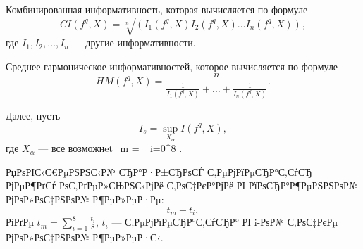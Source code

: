 Комбинированная информативность, которая вычисляется по формуле
\[CI(f^{q}, X) = \sqrt[n]{(I_{1}(f^{q}, X) I_{2}(f^{q}, X) \dots I_{n}(f^{q},
X))},\] где \(I_{1}, I_{2}, \dots, I_{n}\) --- другие
информативности.

Среднее гармоническое информативностей, которое вычисляется по
формуле
\[HM(f^{q}, X) = \frac{n}{\frac{1}{I_{1}(f^{q}, X)} + \dots + \frac{1}{I_{n}(f^{q}, X)}}.\]


Далее, пусть
\[I_{s} = \sup_{X_{\alpha}}I(f^{q}, X),\]
где \(X_{\alpha}\) --- все возможнe{t_{m}} = \sum_{i=0}^{8}
        \).
        \item[2.2)] РџРѕРІС‹С€РµРЅРЅС‹Р№ СЂР°Р·Р±СЂРѕСЃ С‚РµРјРїРµСЂР°С‚СѓСЂ РјРµР¶РґСѓ РѕС‚РґРµР»СЊРЅС‹РјРё С‚РѕС‡РєР°РјРё РІ РїРѕСЂР°Р¶РµРЅРЅРѕР№ РјРѕР»РѕС‡РЅРѕР№ Р¶РµР»РµР·Рµ:
        \[t_{m} - t_{i},\]
        РіРґРµ \(t_{m} = \sum_{i=1}^{8}\frac{t_{i}}{8}\), \(t_{i}\) --- С‚РµРјРїРµСЂР°С‚СѓСЂР° РІ i-РѕР№ С‚РѕС‡РєРµ
        РјРѕР»РѕС‡РЅРѕР№ Р¶РµР»РµР·С‹.

